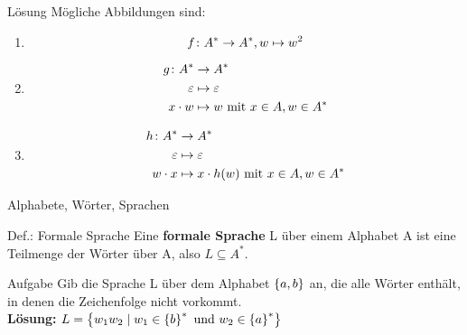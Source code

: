 \begin{frame}
	\begin{block}{Lösung}
		Mögliche Abbildungen sind:
		\begin{enumerate}
			\item \[f \colon A^{\ast} \to A^{\ast}, w \mapsto w^2\]
			\item \begin{align*}
				g \colon A^{\ast} &\to A^{\ast} \\
				\varepsilon &\mapsto \varepsilon \\
				x \cdot w &\mapsto w \text{ mit } x \in A, w\in A^{\ast}
			\end{align*}
			\item \begin{align*}
				h \colon A^{\ast} &\to A^{\ast} \\
				\varepsilon &\mapsto \varepsilon \\
				w \cdot x &\mapsto x \cdot h(w) \text{ mit } x \in A, w\in A^{\ast}
			\end{align*}
		\end{enumerate}
	\end{block}
\end{frame}

\begin{frame}{Alphabete, Wörter, Sprachen}
	\begin{block}{Def.: Formale Sprache}
		Eine \textbf{formale Sprache} L über einem Alphabet A ist eine Teilmenge der Wörter über A, also \(L \subseteq A^{*}\).
	\end{block}

	\begin{exampleblock}{Aufgabe}
		Gib die Sprache L über dem Alphabet \(\left\{ a,b \right\}\) an, die alle Wörter enthält, in denen die Zeichenfolge  nicht vorkommt.\\
		\pause
		\textbf{Lösung:} \(L = \left\{ w_{1}w_{2} \mid w_{1} \in \left\{ b \right\}^{*} \text{ und } w_{2} \in \left\{ a \right\}^{*} \right\}\)
	\end{exampleblock}
\end{frame}
